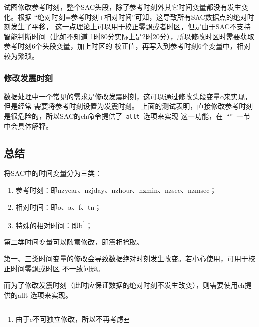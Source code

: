 试图修改参考时刻，整个SAC头段，除了参考时刻外其它时间变量都没有发生变化。根据
``绝对时刻=参考时刻+相对时间''可知，这导致所有SAC数据点的绝对时刻发生了平移，
这一点理论上可以用于校正零飘或者时区，但是由于SAC不支持智能判断时间（比如不知道
1时80分实际上是2时20分），所以修改时区时需要获取参考时刻6个头段变量，加上时区的
校正值，再写入到参考时刻6个变量中，相对较为繁琐。

\subsubsection{修改发震时刻}
数据处理中一个常见的需求是修改发震时刻，这可以通过修改头段变量o来实现，但是经常
需要将参考时刻设置为发震时刻。
上面的测试表明，直接修改参考时刻是很危险的，所以SAC的ch命令提供了~\lstinline{allt}~选项来实现
这一功能，在~``''~一节中会具体解释。

\subsection{总结}
将SAC中的时间变量分为三类：
\begin{enumerate}
\item 参考时刻：即nzyear、nzjday、nzhour、nzmin、nzsec、nzmsec；
\item 相对时间：即o、a、f、tn；
\item 特殊的相对时间：即b\footnote{由于e不可独立修改，所以不再考虑}；
\end{enumerate}

第二类时间变量可以随意修改，即震相拾取。

第一、三类时间变量的修改会导致数据绝对时刻发生改变。若小心使用，可用于校正时间零飘或时区
不一致问题。

而为了修改发震时刻（此时应保证数据的绝对时刻不发生改变），则需要使用ch提供的allt
选项来实现。
